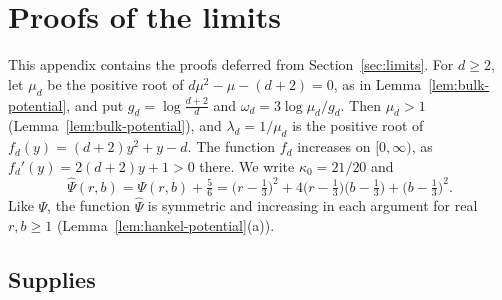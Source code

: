 \section{Proofs of the limits}
\label{sec:lower-proof}

This appendix contains the proofs deferred from Section~\ref{sec:limits}.
For \(d\ge2\), let \(\mu_d\) be the positive root of
\(d\mu^2-\mu-(d+2)=0\), as in Lemma~\ref{lem:bulk-potential}, and put
\(g_d=\log\frac{d+2}d\) and \(\omega_d=3\log\mu_d/g_d\). Then
\(\mu_d>1\) (Lemma~\ref{lem:bulk-potential}), and \(\lambda_d=1/\mu_d\)
is the positive root of \(f_d(y)=(d+2)y^2+y-d\). The function \(f_d\)
increases on \([0,\infty)\), as \(f_d'(y)=2(d+2)y+1>0\) there. We write
\(\kappa_0=21/20\) and
\[
 \hat\Psi(r,b)=\Psi(r,b)+\tfrac56
 =\bigl(r-\tfrac13\bigr)^2+4\bigl(r-\tfrac13\bigr)\bigl(b-\tfrac13\bigr)+\bigl(b-\tfrac13\bigr)^2 .
\]
Like \(\Psi\), the function \(\hat\Psi\) is symmetric and increasing in
each argument for real \(r,b\ge1\) (Lemma~\ref{lem:hankel-potential}(a)).

\subsection{Supplies}
\label{subsec:proof-recycling}

